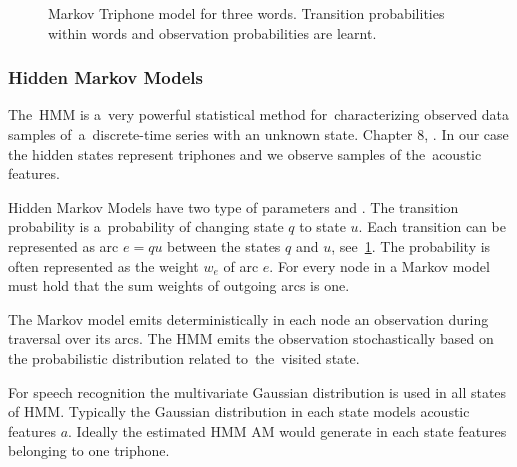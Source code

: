 {%

\begin{figure}[!htp]
    \begin{center}
    
    \caption{Markov Triphone model for three words. Transition probabilities within
    words and observation probabilities are learnt.}
    \label{fig:hmm_words} 
    \end{center}
\end{figure}


%     
%     

\subsubsection*{Hidden Markov Models}
The~\ac{HMM} is a~very powerful statistical method for~characterizing observed data samples
of~a~discrete-time series with an unknown state. Chapter 8, \cite{huang2001spoken}.
In our case the hidden states represent triphones and we observe samples of the~acoustic features.

Hidden Markov Models have two type of parameters 
and .
The transition probability is a~probability of changing state $q$ to state $u$.
Each transition can be represented as arc $e=qu$ between the states $q$ and $u$, see~\ref{fig:hmm_words}.
The probability is often represented as the weight $w_e$ of arc $e$.
For every node in a Markov model must hold that the sum weights of outgoing arcs is one.

The Markov model emits deterministically in each node an observation during traversal over its arcs.
The \acl{HMM} emits the observation stochastically based on the probabilistic distribution related
to~the~visited state.

For speech recognition the multivariate Gaussian distribution is used in all states of \ac{HMM}. 
Typically the Gaussian distribution in each state models acoustic features $a$.
Ideally the estimated \ac{HMM} \ac{AM} would generate in each state features belonging to one triphone.

}
